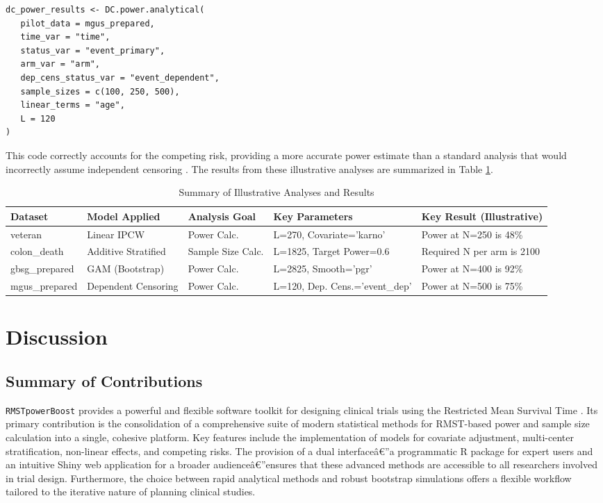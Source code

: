 \documentclass[article]{jss}
\begin{document}
\begin{lstlisting}
dc_power_results <- DC.power.analytical(
   pilot_data = mgus_prepared,
   time_var = "time",
   status_var = "event_primary",
   arm_var = "arm",
   dep_cens_status_var = "event_dependent",
   sample_sizes = c(100, 250, 500),
   linear_terms = "age",
   L = 120
)
\end{lstlisting}
This code correctly accounts for the competing risk, providing a more accurate power estimate than a standard analysis that would incorrectly assume independent censoring \cite{[1]}. The results from these illustrative analyses are summarized in Table \ref{tab:example_summary}.

\begin{table}[h!]
\centering
\caption{Summary of Illustrative Analyses and Results}
\label{tab:example_summary}
\begin{tabular}{@{}lllll@{}}
\toprule
\textbf{Dataset} & \textbf{Model Applied} & \textbf{Analysis Goal} & \textbf{Key Parameters} & \textbf{Key Result (Illustrative)} \\ \midrule
veteran & Linear IPCW & Power Calc. & L=270, Covariate='karno' & Power at N=250 is 48\% \\
colon\_death & Additive Stratified & Sample Size Calc. & L=1825, Target Power=0.6 & Required N per arm is 2100 \\
gbsg\_prepared & GAM (Bootstrap) & Power Calc. & L=2825, Smooth='pgr' & Power at N=400 is 92\% \\
mgus\_prepared & Dependent Censoring & Power Calc. & L=120, Dep. Cens.='event\_dep' & Power at N=500 is 75\% \\ \bottomrule
\end{tabular}
\end{table}

\section{Discussion}

\subsection{Summary of Contributions}
\texttt{RMSTpowerBoost} provides a powerful and flexible software toolkit for designing clinical trials using the Restricted Mean Survival Time \cite{[1]}. Its primary contribution is the consolidation of a comprehensive suite of modern statistical methods for RMST-based power and sample size calculation into a single, cohesive platform. Key features include the implementation of models for covariate adjustment, multi-center stratification, non-linear effects, and competing risks. The provision of a dual interfaceâ€”a programmatic R package for expert users and an intuitive Shiny web application for a broader audienceâ€”ensures that these advanced methods are accessible to all researchers involved in trial design. Furthermore, the choice between rapid analytical methods and robust bootstrap simulations offers a flexible workflow tailored to the iterative nature of planning clinical studies.
\end{document}
